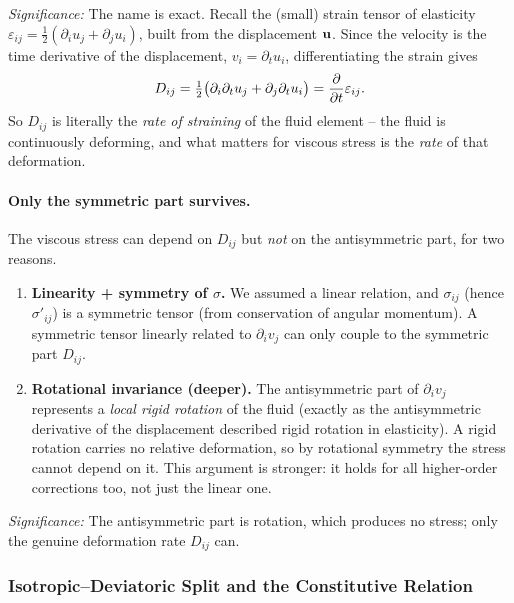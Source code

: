 \documentclass[../main.tex]{subfiles}
\begin{document}
\textit{Significance:} The name is exact. Recall the (small) strain tensor of elasticity $\varepsilon_{ij}=\tfrac{1}{2}(\partial_i u_j+\partial_j u_i)$, built from the displacement $\mathbf{u}$. Since the velocity is the time derivative of the displacement, $v_i=\partial_t u_i$, differentiating the strain gives
\begin{equation}
  D_{ij} = \tfrac{1}{2}\big(\partial_i\partial_t u_j + \partial_j\partial_t u_i\big) = \pdv{t}\varepsilon_{ij} .
  \label{eq:lec18_Dij_is_strainrate}
\end{equation}
So $D_{ij}$ is literally the \emph{rate of straining} of the fluid element -- the fluid is continuously deforming, and what matters for viscous stress is the \emph{rate} of that deformation.

\paragraph{Only the symmetric part survives.} The viscous stress can depend on $D_{ij}$ but \emph{not} on the antisymmetric part, for two reasons.
\begin{enumerate}
  \item \textbf{Linearity + symmetry of $\sigma$.} We assumed a linear relation, and $\sigma_{ij}$ (hence $\sigma'_{ij}$) is a symmetric tensor (from conservation of angular momentum). A symmetric tensor linearly related to $\partial_i v_j$ can only couple to the symmetric part $D_{ij}$.
  \item \textbf{Rotational invariance (deeper).} The antisymmetric part of $\partial_i v_j$ represents a \emph{local rigid rotation} of the fluid (exactly as the antisymmetric derivative of the displacement described rigid rotation in elasticity). A rigid rotation carries no relative deformation, so by rotational symmetry the stress cannot depend on it. This argument is stronger: it holds for all higher-order corrections too, not just the linear one.
\end{enumerate}
\textit{Significance:} The antisymmetric part is rotation, which produces no stress; only the genuine deformation rate $D_{ij}$ can.

\subsubsection{Isotropic--Deviatoric Split and the Constitutive Relation}\label{sec:lec18:constitutive}
\end{document}
